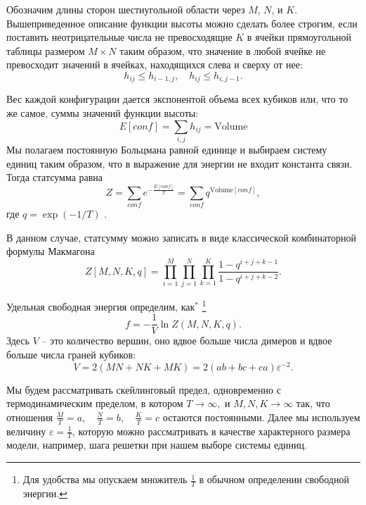 \documentclass{article}
\begin{document}
Обозначим длины сторон шестиугольной области через $M$, $N$, и $K$. 
Вышеприведенное описание функции высоты можно сделать более строгим, если поставить неотрицательные
числа не превосходящие  $K$ в ячейки прямоугольной таблицы размером  $M\times N$ таким образом, что
значение в любой ячейке не превосходит значений в  ячейках, находящихся слева и сверху от нее:
\begin{equation}
  \label{eq:1}
  h_{ij}\leq h_{i-1,j},\quad h_{ij}\leq h_{i,j-1}.
\end{equation}

Вес каждой конфигурации дается экспонентой объема всех кубиков или, что то же самое, суммы значений
функции высоты:  
\begin{equation*}
  \label{eq:10}
  E[conf]=\sum_{i,j} h_{ij}=\mathrm{Volume}
\end{equation*}
Мы полагаем постоянную Больцмана равной единице и выбираем систему единиц таким образом, что в
выражение для энергии не входит константа связи. Тогда статсумма равна
\begin{equation*}
  \label{eq:14}
  Z=\sum_{conf} e^{-\frac{E[conf]}{T}}=\sum_{conf}q^{\mathrm{Volume}[conf]}, 
\end{equation*}
где $q=\exp\left(-1/T\right)$ .

В данном случае, статсумму можно записать в виде классической комбинаторной формулы Макмагона
~\cite{vuletic2009generalization}
\begin{equation}
  \label{eq:12}
   Z[M,N,K,q]=\prod_{i=1}^{M}\prod_{j=1}^{N}\prod_{k=1}^{K}\frac{1-q^{i+j+k-1}}{1-q^{i+j+k-2}}.
\end{equation}

Удельная свободная энергия определим, как$^{*}$
\footnote{Для удобства мы опускаем множитель  $\frac{1}{T}$ в обычном определении свободной энергии.}
\begin{equation*}
  \label{eq:17}
  f=-\frac{1}{V}\ln Z(M,N,K,q).
\end{equation*}
Здесь $V$ -- это количество вершин, оно вдвое больше числа димеров и вдвое больше числа граней
кубиков:
\begin{equation}
  \label{eq:19}
  V=2(MN+NK+MK)=2(ab+bc+ca) \varepsilon^{-2}.
\end{equation}

Мы будем рассматривать скейлинговый предел, одновременно с термодинамическим пределом, в котором
$T\to \infty,$ и  $M,N,K\to \infty$ так, что отношения $\frac{M}{T}=a,\quad \frac{N}{T}=b, \quad
\frac{K}{T}=c$ остаются постоянными.  Далее мы используем величину $\varepsilon=\frac{1}{T}$,
которую можно рассматривать в качестве характерного размера модели, например, шага решетки при нашем
выборе системы единиц.
\end{document}

